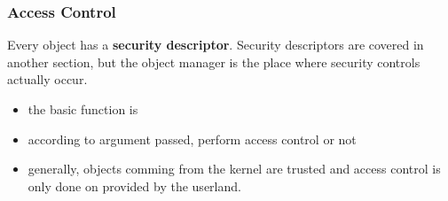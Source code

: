 
\begin{frame}
  \frametitle{Access Control}

  Every object has a \textbf{security descriptor}. Security descriptors are covered in
  another section, but the object manager is the place where security controls actually
  occur.

  \begin{itemize}
    \item
      the basic function is 
    \item
      according to argument passed, perform access control or not
   \item
     generally, objects comming from the kernel are trusted and access control
     is only done on  provided by the userland.
  \end{itemize}
\end{frame}


